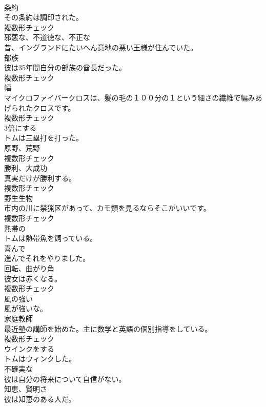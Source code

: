 \documentclass[8pt]{extreport}
\begin{document}
\begin{CJK}{UTF8}{min}
\\	[名詞]	条約	
\\	その条約は調印された。	
\\	複数形チェック
\\	[形容詞]	邪悪な、不道徳な、不正な	
\\	昔、イングランドにたいへん意地の悪い王様が住んでいた。	
\\	[名詞]	部族	
\\	彼は35年間自分の部族の酋長だった。	
\\	複数形チェック
\\	[名詞]	幅	
\\	マイクロファイバークロスは、髪の毛の１００分の１という細さの繊維で編みあげられたクロスです。	
\\	複数形チェック
\\	[動詞]	3倍にする	
\\	トムは三塁打を打った。	
\\	[名詞]	原野、荒野	
\\	複数形チェック
\\	[名詞]	勝利、大成功	
\\	真実だけが勝利する。	
\\	複数形チェック
\\	[名詞]	野生生物	
\\	市内の川に禁猟区があって、カモ類を見るならそこがいいです。	
\\	複数形チェック
\\	[形容詞]	熱帯の	
\\	トムは熱帯魚を飼っている。	
\\	[副詞]	喜んで	
\\	進んでそれをやりました。	
\\	[名詞]	回転、曲がり角	
\\	彼女は赤くなる。	
\\	複数形チェック
\\	[形容詞]	風の強い	
\\	風が強いな。	
\\	[名詞]	家庭教師	
\\	最近塾の講師を始めた。主に数学と英語の個別指導をしている。	
\\	複数形チェック
\\	[動詞]	ウインクをする	
\\	トムはウィンクした。	
\\	[形容詞]	不確実な	
\\	彼は自分の将来について自信がない。	
\\	[名詞]	知恵、賢明さ	
\\	彼は知恵のある人だ。	

\end{CJK}
\end{document}
